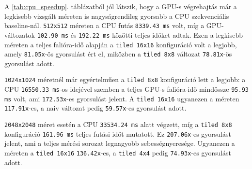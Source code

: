 \documentclass[12pt,a4paper]{article}
\begin{document}
\begin{table}[H]
\centering
\caption{CPU baseline-hoz viszonyított teljes falióra-idők és gyorsulások a \texttt{wrap=0} esetén.}
\label{tab:cpu_speedup}
\end{table}

A \ref{tab:cpu_speedup}. táblázatból jól látszik, hogy a GPU-s végrehajtás már a legkisebb vizsgált méreten is nagyságrendileg gyorsabb a CPU szekvenciális baseline-nál. \texttt{512x512} méreten a CPU futás \texttt{8339.43 ms} volt, míg a GPU-változatok \texttt{102.90 ms} és \texttt{192.22 ms} közötti teljes időket adtak. Ezen a legkisebb méreten a teljes falióra-idő alapján a \texttt{tiled 16x16} konfiguráció volt a legjobb, amely \texttt{81.05x}-ös gyorsulást ért el, miközben a \texttt{tiled 8x8} változat \texttt{78.81x}-ös gyorsulást adott.

\texttt{1024x1024} méretnél már egyértelműen a \texttt{tiled 8x8} konfiguráció lett a legjobb: a CPU \texttt{16550.33 ms}-os idejével szemben a teljes GPU-s falióra-idő mindössze \texttt{95.93 ms} volt, ami \texttt{172.53x}-es gyorsulást jelent. A \texttt{tiled 16x16} ugyanezen a méreten \texttt{117.91x}-es, a naiv változat pedig \texttt{59.57x}-es gyorsulást adott.

\texttt{2048x2048} méret esetén a CPU \texttt{33534.24 ms} alatt végzett, míg a \texttt{tiled 8x8} konfiguráció \texttt{161.96 ms} teljes futási időt mutatott. Ez \texttt{207.06x}-es gyorsulást jelent, ami a teljes mérési sorozat legnagyobb sebességnyeresége. Ugyanezen a méreten a \texttt{tiled 16x16} \texttt{136.42x}-es, a \texttt{tiled 4x4} pedig \texttt{74.93x}-es gyorsulást adott.
\end{document}

